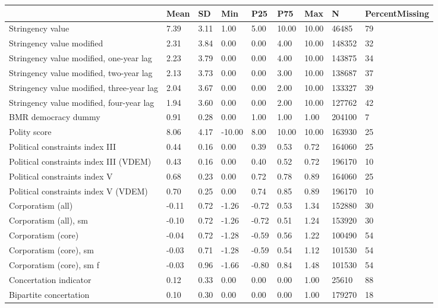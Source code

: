 
\begin{longtable}{lllllllll}
\toprule
  & Mean & SD & Min & P25 & P75 & Max & N & PercentMissing\\
\midrule
Stringency value & 7.39 & 3.11 & 1.00 & 5.00 & 10.00 & 10.00 & 46485 & 79\\
Stringency value modified & 2.31 & 3.84 & 0.00 & 0.00 & 4.00 & 10.00 & 148352 & 32\\
Stringency value modified, one-year lag & 2.23 & 3.79 & 0.00 & 0.00 & 4.00 & 10.00 & 143875 & 34\\
Stringency value modified, two-year lag & 2.13 & 3.73 & 0.00 & 0.00 & 3.00 & 10.00 & 138687 & 37\\
Stringency value modified, three-year lag & 2.04 & 3.67 & 0.00 & 0.00 & 2.00 & 10.00 & 133327 & 39\\
\addlinespace
Stringency value modified, four-year lag & 1.94 & 3.60 & 0.00 & 0.00 & 2.00 & 10.00 & 127762 & 42\\
BMR democracy dummy & 0.91 & 0.28 & 0.00 & 1.00 & 1.00 & 1.00 & 204100 & 7\\
Polity score & 8.06 & 4.17 & -10.00 & 8.00 & 10.00 & 10.00 & 163930 & 25\\
Political constraints index III & 0.44 & 0.16 & 0.00 & 0.39 & 0.53 & 0.72 & 164060 & 25\\
Political constraints index III (VDEM) & 0.43 & 0.16 & 0.00 & 0.40 & 0.52 & 0.72 & 196170 & 10\\
\addlinespace
Political constraints index V & 0.68 & 0.23 & 0.00 & 0.72 & 0.78 & 0.89 & 164060 & 25\\
Political constraints index V (VDEM) & 0.70 & 0.25 & 0.00 & 0.74 & 0.85 & 0.89 & 196170 & 10\\
Corporatism (all) & -0.11 & 0.72 & -1.26 & -0.72 & 0.53 & 1.34 & 152880 & 30\\
Corporatism (all), sm & -0.10 & 0.72 & -1.26 & -0.72 & 0.51 & 1.24 & 153920 & 30\\
Corporatism (core) & -0.04 & 0.72 & -1.28 & -0.59 & 0.56 & 1.22 & 100490 & 54\\
\addlinespace
Corporatism (core), sm & -0.03 & 0.71 & -1.28 & -0.59 & 0.54 & 1.12 & 101530 & 54\\
Corporatism (core), sm f & -0.03 & 0.96 & -1.66 & -0.80 & 0.84 & 1.48 & 101530 & 54\\
Concertation indicator & 0.12 & 0.33 & 0.00 & 0.00 & 0.00 & 1.00 & 25610 & 88\\
Bipartite concertation & 0.10 & 0.30 & 0.00 & 0.00 & 0.00 & 1.00 & 179270 & 18\\

\end{longtable}
